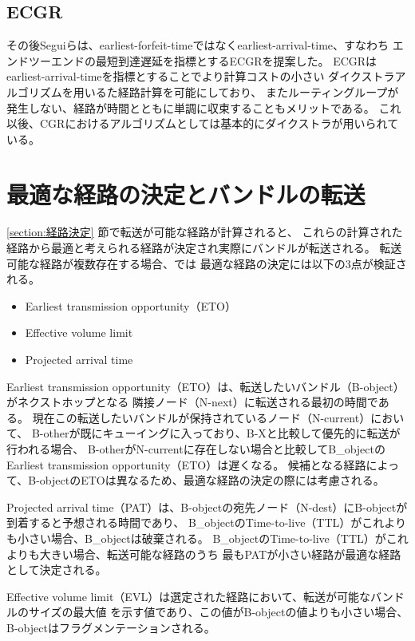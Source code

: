 \subsection{ECGR}
その後Seguiらは、earliest-forfeit-timeではなくearliest-arrival-time、すなわち
エンドツーエンドの最短到達遅延を指標とするECGRを提案した\cite{6134460}。
ECGRはearliest-arrival-timeを指標とすることでより計算コストの小さい
ダイクストラアルゴリズムを用いるた経路計算を可能にしており、
またルーティングループが発生しない、経路が時間とともに単調に収束することもメリットである。
これ以後、CGRにおけるアルゴリズムとしては基本的にダイクストラが用いられている。

\section{最適な経路の決定とバンドルの転送}
\label{section:バンドルの転送}

\ref{section:経路決定} 節で転送が可能な経路が計算されると、
これらの計算された経路から最適と考えられる経路が決定され実際にバンドルが転送される。
転送可能な経路が複数存在する場合、\cite{schedule_aware_bundle_routing}では
最適な経路の決定には以下の3点が検証される。
\begin{itemize}
    \item Earliest transmission opportunity（ETO）
    \item Effective volume limit
    \item Projected arrival time
\end{itemize}
Earliest transmission opportunity（ETO）は、転送したいバンドル（B-object）がネクストホップとなる
隣接ノード（N-next）に転送される最初の時間である。
現在この転送したいバンドルが保持されているノード（N-current）において、
B-otherが既にキューイングに入っており、B-Xと比較して優先的に転送が行われる場合、
B-otherがN-currentに存在しない場合と比較してB_objectの
Earliest transmission opportunity（ETO）は遅くなる。
候補となる経路によって、B-objectのETOは異なるため、最適な経路の決定の際には考慮される。

Projected arrival time（PAT）は、B-objectの宛先ノード（N-dest）にB-objectが到着すると予想される時間であり、
B_objectのTime-to-live（TTL）がこれよりも小さい場合、B_objectは破棄される。
B_objectのTime-to-live（TTL）がこれよりも大きい場合、転送可能な経路のうち
最もPATが小さい経路が最適な経路として決定される。

Effective volume limit（EVL）は選定された経路において、転送が可能なバンドルのサイズの最大値
を示す値であり、この値がB-objectの値よりも小さい場合、B-objectはフラグメンテーションされる。



